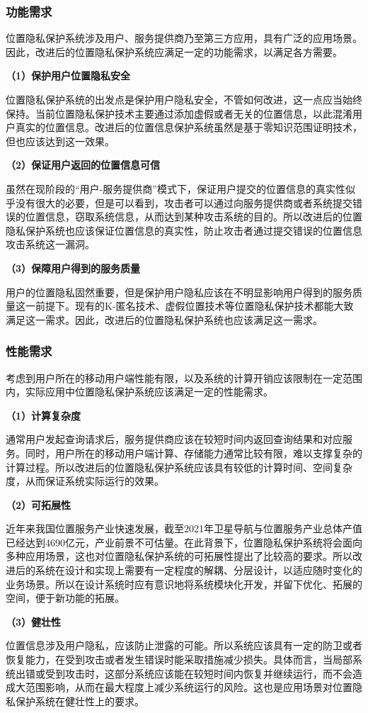 \documentclass[zihao=-4]{ctexart}
\begin{document}
\subsubsection{功能需求}
位置隐私保护系统涉及用户、服务提供商乃至第三方应用，具有广泛的应用场景。因此，改进后的位置隐私保护系统应满足一定的功能需求，以满足各方需要。
\par 
\textbf{（1）保护用户位置隐私安全}
\par 
位置隐私保护系统的出发点是保护用户隐私安全，不管如何改进，这一点应当始终保持。当前位置隐私保护技术主要通过添加虚假或者无关的位置信息，以此混淆用户真实的位置信息。改进后的位置信息保护系统虽然是基于零知识范围证明技术，但也应该达到这一效果。
\par 
\textbf{（2）保证用户返回的位置信息可信}
\par 
虽然在现阶段的“用户-服务提供商”模式下，保证用户提交的位置信息的真实性似乎没有很大的必要，但是可以看到，攻击者可以通过向服务提供商或者系统提交错误的位置信息，窃取系统信息，从而达到某种攻击系统的目的。所以改进后的位置隐私保护系统也应该保证位置信息的真实性，防止攻击者通过提交错误的位置信息攻击系统这一漏洞。
\par 
\textbf{（3）保障用户得到的服务质量}
\par 
用户的位置隐私固然重要，但是保护用户隐私应该在不明显影响用户得到的服务质量这一前提下。现有的K-匿名技术、虚假位置技术等位置隐私保护技术都能大致满足这一需求。因此，改进后的位置隐私保护系统也应该满足这一需求。

\subsubsection{性能需求}
考虑到用户所在的移动用户端性能有限，以及系统的计算开销应该限制在一定范围内，实际应用中位置隐私保护系统应该满足一定的性能需求。
\par 
\textbf{（1）计算复杂度}
\par 
通常用户发起查询请求后，服务提供商应该在较短时间内返回查询结果和对应服务。同时，用户所在的移动用户端计算、存储能力通常比较有限，难以支撑复杂的计算过程。所以改进后的位置隐私保护系统应该具有较低的计算时间、空间复杂度，从而保证系统实际运行的效果。
\par 
\textbf{（2）可拓展性}
\par 
近年来我国位置服务产业快速发展，截至2021年卫星导航与位置服务产业总体产值已经达到4690亿元\cite{czh_5.1}，产业前景不可估量。在此背景下，位置隐私保护系统将会面向多种应用场景，这也对位置隐私保护系统的可拓展性提出了比较高的要求。所以改进后的系统在设计和实现上需要有一定程度的解耦、分层设计，以适应随时变化的业务场景。所以在设计系统时应有意识地将系统模块化开发，并留下优化、拓展的空间，便于新功能的拓展。
\par 
\textbf{（3）健壮性}
\par 
位置信息涉及用户隐私，应该防止泄露的可能。所以系统应该具有一定的防卫或者恢复能力，在受到攻击或者发生错误时能采取措施减少损失。具体而言，当局部系统出错或受到攻击时，这部分系统应该能在较短时间内恢复并继续运行，而不会造成大范围影响，从而在最大程度上减少系统运行的风险。这也是应用场景对位置隐私保护系统在健壮性上的要求。
\end{document}
